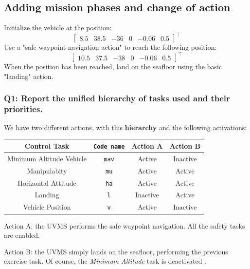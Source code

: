 \documentclass{article}
\begin{document}
\subsection{Adding mission phases and change of action}
Initialize the vehicle at the position:
\begin{displaymath}
\begin{bmatrix} 8.5 & 38.5 & -36 & 0 & -0.06 & 0.5 \end{bmatrix}^\top
\end{displaymath} 
Use a "safe waypoint navigation action" to reach the following position: 
\begin{displaymath}
\begin{bmatrix} 10.5 & 37.5 & -38 & 0 & -0.06 & 0.5 \end{bmatrix}^\top
\end{displaymath} 
When the position has been reached, land on the seafloor using the basic "landing" action.

\subsubsection{Q1: Report the unified hierarchy of tasks used and their priorities.}

We have two different actions, with this \textbf{hierarchy} and the following activations: 
\begin{center}
\begin{tabular}{ | c | c | c | c |}
\hline
 Control Task & \texttt{Code name} & Action A & Action B \\
\hline
 Minimum Altitude Vehicle &  \texttt{mav} & Active & Inactive  \\  
 Manipulabity &  \texttt{mu} & Active & Active  \\
 Horizontal Attitude &  \texttt{ha} & Active & Active \\
 Landing & \texttt{l} &Inactive & Active \\
 Vehicle Position &  \texttt{v} &Active & Inactive \\
 \hline
\end{tabular}
\end{center}

\begin{description}
\item Action A: the UVMS performs the safe waypoint navigation. All the safety tasks are enabled. 
\item Action B: the UVMS simply lands on the seafloor, performing the previous exercise task. Of course, the \textit{Minimum Altitude} task is deactivated .
\end{description}
 
\end{document}
